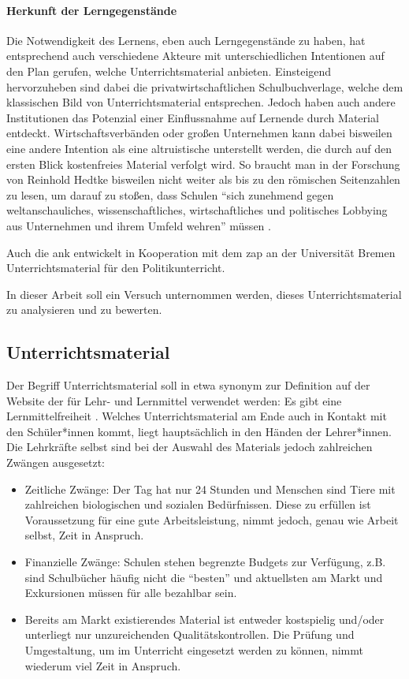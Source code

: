 \paragraph{Herkunft der Lerngegenstände}
Die Notwendigkeit des Lernens, eben auch Lerngegenstände zu haben, hat entsprechend auch verschiedene Akteure mit unterschiedlichen Intentionen auf den Plan gerufen, welche Unterrichtsmaterial anbieten.
Einsteigend hervorzuheben sind dabei die privatwirtschaftlichen Schulbuchverlage, welche dem klassischen Bild von Unterrichtsmaterial entsprechen. Jedoch haben auch andere Institutionen das Potenzial einer Einflussnahme auf Lernende durch 
Material entdeckt. Wirtschaftsverbänden oder großen Unternehmen kann dabei bisweilen eine andere Intention als eine altruistische unterstellt werden, die durch auf den ersten Blick kostenfreies Material verfolgt wird. So braucht man in der Forschung von Reinhold Hedtke bisweilen nicht weiter als bis zu den römischen Seitenzahlen zu lesen, um darauf zu stoßen, dass Schulen \enquote{sich zunehmend gegen weltanschauliches, wissenschaftliches, wirtschaftliches und politisches Lobbying aus Unternehmen und ihrem Umfeld wehren} müssen \autocite[i]{Hedtke2016}. 


Auch die \gls{ank} entwickelt in Kooperation mit dem \gls{zap} an der Universität Bremen Unterrichtsmaterial für den Politikunterricht.


In dieser Arbeit soll ein Versuch unternommen werden, dieses Unterrichtsmaterial zu analysieren und zu bewerten. %

\subsection{Unterrichtsmaterial}
Der Begriff Unterrichtsmaterial soll in etwa synonym zur Definition auf der Website der \textcite{KMKMittel} für Lehr- und Lernmittel verwendet werden: 
Es gibt eine Lernmittelfreiheit \autocite[]{KMKMittel}.
Welches Unterrichtsmaterial am Ende auch in Kontakt mit den Schüler*innen kommt, liegt hauptsächlich in den Händen der Lehrer*innen.
Die Lehrkräfte selbst sind bei der Auswahl des Materials jedoch zahlreichen Zwängen ausgesetzt:
\begin{itemize}
    \item Zeitliche Zwänge: Der Tag hat nur 24 Stunden und Menschen sind Tiere mit zahlreichen biologischen und sozialen Bedürfnissen. Diese zu erfüllen ist Voraussetzung für eine gute Arbeitsleistung, nimmt jedoch, genau wie Arbeit selbst, Zeit in Anspruch. 
    \item Finanzielle Zwänge: Schulen stehen begrenzte Budgets zur Verfügung, z.B. sind Schulbücher häufig nicht die \enquote{besten} und aktuellsten am Markt und Exkursionen müssen für alle bezahlbar sein. 
    \item Bereits am Markt existierendes Material ist entweder kostspielig und/oder unterliegt nur unzureichenden Qualitätskontrollen. Die Prüfung und Umgestaltung, um im Unterricht eingesetzt werden zu können, nimmt wiederum viel Zeit in Anspruch. 
\end{itemize}

